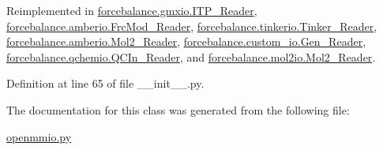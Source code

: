 \-Reimplemented in \hyperlink{classforcebalance_1_1gmxio_1_1ITP__Reader_ab35c32e7ecf74028641613f90906bd37}{forcebalance.\-gmxio.\-I\-T\-P\-\_\-\-Reader}, \hyperlink{classforcebalance_1_1amberio_1_1FrcMod__Reader_ad25c7e07aadb587268f3beb7a379766c}{forcebalance.\-amberio.\-Frc\-Mod\-\_\-\-Reader}, \hyperlink{classforcebalance_1_1tinkerio_1_1Tinker__Reader_a7078ca5338dff178edf5afb05a1f32c8}{forcebalance.\-tinkerio.\-Tinker\-\_\-\-Reader}, \hyperlink{classforcebalance_1_1amberio_1_1Mol2__Reader_a76b4f0ec6731d7072da6be5768ebf979}{forcebalance.\-amberio.\-Mol2\-\_\-\-Reader}, \hyperlink{classforcebalance_1_1custom__io_1_1Gen__Reader_a408f5717e02bcc0d87b8e60bd8b0714e}{forcebalance.\-custom\-\_\-io.\-Gen\-\_\-\-Reader}, \hyperlink{classforcebalance_1_1qchemio_1_1QCIn__Reader_a1ff6018724f2760bb6dd32dd3c854328}{forcebalance.\-qchemio.\-Q\-C\-In\-\_\-\-Reader}, and \hyperlink{classforcebalance_1_1mol2io_1_1Mol2__Reader_a39adb792b05aab536e3376ecf2ec5778}{forcebalance.\-mol2io.\-Mol2\-\_\-\-Reader}.



\-Definition at line 65 of file \-\_\-\-\_\-init\-\_\-\-\_\-.\-py.



\-The documentation for this class was generated from the following file\-:\begin{DoxyCompactItemize}
\item 
\hyperlink{openmmio_8py}{openmmio.\-py}\end{DoxyCompactItemize}
